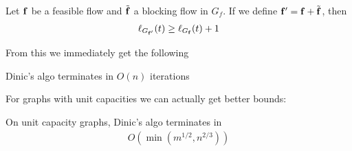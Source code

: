 \begin{lema}
    Let $\mathbf{f}$ be a feasible flow and $\Tilde{\mathbf{f}}$ a blocking flow in $G_f$. If we define $\mathbf{f} ' = \mathbf{f} + \Tilde{\mathbf{f}}$, then 
    \begin{align*}
        \ell_{G_{\mathbf{f}'}}(t) \geq \ell_{G_{\mathbf{f}}}(t) +1
    \end{align*}
\end{lema}

\obvs

From this we immediately get the following

\begin{izrek}
    Dinic's algo terminates in $O(n)$ iterations
\end{izrek}

\obvs

For graphs with unit capacities we can actually get better bounds:

\begin{izrek}
    On unit capacity graphs, Dinic's algo terminates in
    \begin{align*}
        O ( \min (m^{1/2}, n^{2/3}))
    \end{align*}
\end{izrek}

